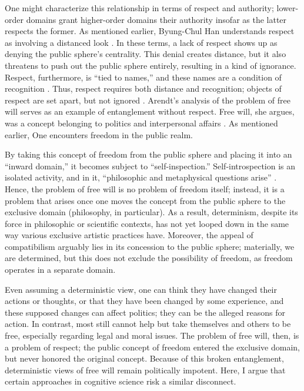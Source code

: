 \documentclass[12pt,letterpaper]{article}
\begin{document}
One might characterize this relationship in terms of respect and authority;
lower-order domains grant higher-order domains their authority insofar as the
latter respects the former. As mentioned earlier, Byung-Chul Han understands
respect as involving a distanced look \autocite[1]{hanSwarm2017}. In these
terms, a lack of respect shows up as denying the public sphere's centrality.
This denial creates distance, but it also threatens to push out the public
sphere entirely, resulting in a kind of ignorance. Respect, furthermore, is
``tied to names,'' and these names are a condition of recognition
\autocite[2]{hanSwarm2017}. Thus, respect requires both distance and
recognition; objects of respect are set apart, but not ignored
\autocite[7]{hanSwarm2017}.  Arendt's analysis of the problem of free will
serves as an example of entanglement without respect. Free will, she argues, was
a concept belonging to politics and interpersonal affairs
\autocite[145]{arendtFuture1968}. As mentioned earlier, One encounters freedom
in the public realm.

By taking this concept of freedom from the public sphere and placing it into an
``inward domain,'' it becomes subject to ``self-inspection.'' Self-introspection
is an isolated activity, and in it, ``philosophic and metaphysical questions
arise'' \autocite[145]{arendtFuture1968}. Hence, the problem of free will is no
problem of freedom itself; instead, it is a problem that arises once one moves
the concept from the public sphere to the exclusive domain (philosophy, in
particular). As a result, determinism, despite its force in philosophic or
scientific contexts, has not yet looped down in the same way various exclusive
artistic practices have. Moreover, the appeal of compatibilism arguably lies in
its concession to the public sphere; materially, we are determined, but this
does not exclude the possibility of freedom, as freedom operates in a separate
domain.

Even assuming a deterministic view, one can think they have changed their
actions or thoughts, or that they have been changed by some experience, and
these supposed changes can affect politics; they can be the alleged reasons for
action. In contrast, most still cannot help but take themselves and others to be
free, especially regarding legal and moral issues. The problem of free will,
then, is a problem of respect; the public concept of freedom entered the
exclusive domain, but never honored the original concept. Because of this broken
entanglement, deterministic views of free will remain politically impotent.
Here, I argue that certain approaches in cognitive science risk a similar
disconnect.
\end{document}
